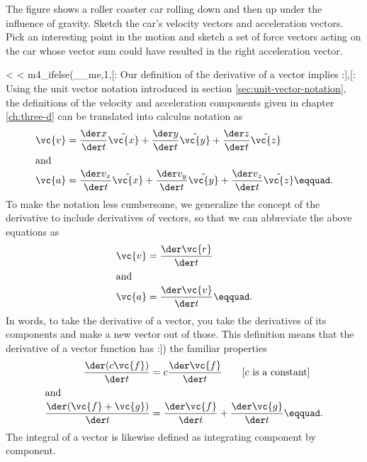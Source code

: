 \begin{dq}\label{dq:roller-coaster}
The figure shows a roller coaster car rolling down and
then up under the influence of gravity. Sketch the car's
velocity vectors and acceleration vectors. Pick an
interesting point in the motion and sketch a set of force
vectors acting on the car whose vector sum could have
resulted in the right acceleration vector.
\end{dq}


<%
<%
m4_ifelse(__me,1,[:
Our definition of the  derivative of a vector implies
:],[:
Using the unit vector notation introduced in section
\ref{sec:unit-vector-notation}, the definitions of the velocity and acceleration components
given in chapter \ref{ch:three-d} can be translated into calculus notation as
\begin{align*}
     \vc{v} &= \frac{\der x}{\der t} \hat{\vc{x}} + \frac{\der y}{\der t} \hat{\vc{y}} + \frac{\der z}{\der t} \hat{\vc{z}}\\
\intertext{and}
     \vc{a} &= \frac{\der v_x}{\der t} \hat{\vc{x}} + \frac{\der v_y}{\der t} \hat{\vc{y}} + \frac{\der v_z}{\der t} \hat{\vc{z}}\eqquad. 
\end{align*}
To make the notation less cumbersome, we generalize the
concept of the derivative to include derivatives of vectors,
so that we can abbreviate the above equations as
\begin{align*}
  \vc{v} &= \frac{\der \vc{r}}{\der t} \\
\intertext{and}
  \vc{a} &= \frac{\der \vc{v}}{\der t}\eqquad.
\end{align*}
In words, to take the derivative of a vector, you take the
derivatives of its components and make a new vector out of
those.
This definition means that the derivative of a vector
function has 
:])%
the familiar properties
\begin{align*}
  \frac{\der(c\vc{f})}{\der t} &= c \frac{\der\vc{f}}{\der t} \qquad \shoveright{\text{[$c$ is a constant]}} \\
\intertext{and}
  \frac{\der(\vc{f}+\vc{g})}{\der t} &=  \frac{\der\vc{f}}{\der t}  +  \frac{\der\vc{g}}{\der t}\eqquad.
\end{align*}
The integral of a vector is likewise defined as integrating
component by component.

